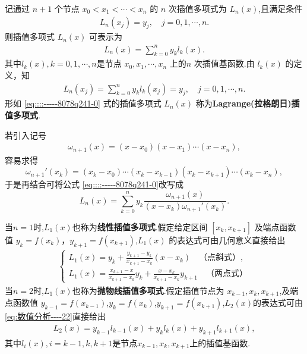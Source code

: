 \documentclass[../../main.tex]{subfiles}
\begin{document}
\begin{theorem}\label{theorem:Lagrange插值多项式111}
记通过 $n + 1$ 个节点 $x_0 < x_1 < \cdots < x_n$ 的 $n$ 次插值多项式为 $L_n(x)$,且满足条件 
\begin{align}
L_n(x_j) = y_j, \quad j = 0, 1, \cdots, n.\label{equation::::----9812792387--89274}
\end{align}
则插值多项式 $L_n(x)$ 可表示为
\begin{align}
L_n(x) = \sum_{k = 0}^n y_k l_k(x).\label{eq::::-----8078q241-0}
\end{align}
其中$l_k(x),k=0,1,\cdots,n$是节点 $x_0, x_1, \cdots, x_n$ 上的$n$ 次插值基函数.由 $l_k(x)$ 的定义，知 
\begin{align}
L_n(x_j) = \sum_{k = 0}^n y_k l_k(x_j) = y_j, \quad j = 0, 1, \cdots, n.\label{eq:数值分析----22}
\end{align}
形如 \eqref{eq::::-----8078q241-0} 式的插值多项式 $L_n(x)$ 称为\textbf{Lagrange(拉格朗日)插值多项式}.

若引入记号 
\begin{align}
\omega_{n + 1}(x) = (x - x_0)(x - x_1) \cdots (x - x_n),\label{eq:数值分析-2.10}
\end{align}
容易求得 
\[
\omega_{n + 1}'(x_k) = (x_k - x_0) \cdots (x_k - x_{k - 1})(x_k - x_{k + 1}) \cdots (x_k - x_n),
\]
于是再结合可将公式 \eqref{eq::::-----8078q241-0}改写成 
\[
L_n(x) = \sum_{k = 0}^n y_k \frac{\omega_{n + 1}(x)}{(x - x_k) \omega_{n + 1}'(x_k)}.
\]
\end{theorem}
\begin{remark}
当$n=1$时,$L_1(x)$也称为\textbf{线性插值多项式}.假定给定区间 $[x_k, x_{k + 1}]$ 及端点函数值 $y_k = f(x_k)$，$y_{k + 1} = f(x_{k + 1})$,$L_1(x)$ 的表达式可由几何意义直接给出 
\begin{align}
\begin{cases} 
L_1(x) = y_k + \frac{y_{k + 1} - y_k}{x_{k + 1} - x_k}(x - x_k) \quad \text{（点斜式）}, \\ 
L_1(x) = \frac{x_{k + 1} - x}{x_{k + 1} - x_k} y_k + \frac{x - x_k}{x_{k + 1} - x_k} y_{k + 1} \quad \text{（两点式）} 
\end{cases}\label{eq::---8978980678--891213--2.1}
\end{align}
当$n=2$时,$L_1(x)$也称为\textbf{抛物线插值多项式}.假定插值节点为 $x_{k - 1}, x_k, x_{k + 1}$,及端点函数值 $y_{k-1} = f(x_{k-1})$,$y_k=f(x_k)$,$y_{k + 1} = f(x_{k + 1})$,$L_2(x)$的表达式可由\eqref{eq:数值分析----22}直接给出
\begin{align}\label{eq:数值分析-2.5}
L_2\left( x \right) =y_{k-1}l_{k-1}\left( x \right) +y_kl_k\left( x \right) +y_{k+1}l_{k+1}\left( x \right),
\end{align}
其中$l_i\left( x \right) ,i=k-1,k,k+1$是节点$x_{k-1},x_k,x_{k+1}$上的插值基函数.
\end{remark}
\end{document}
